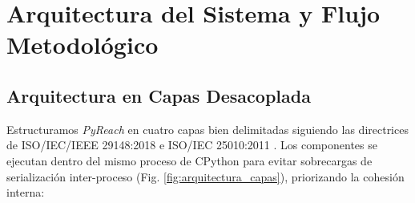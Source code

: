 \documentclass[conference]{IEEEtran}
\begin{document}
\section{Arquitectura del Sistema y Flujo Metodológico}

\subsection{Arquitectura en Capas Desacoplada}
Estructuramos \textit{PyReach} en cuatro capas bien delimitadas siguiendo las directrices de ISO/IEC/IEEE 29148:2018 \cite{iso2018req} e ISO/IEC 25010:2011 \cite{iso2011sqa}. Los componentes se ejecutan dentro del mismo proceso de CPython para evitar sobrecargas de serialización inter-proceso (Fig. \ref{fig:arquitectura_capas}), priorizando la cohesión interna:
\end{document}
